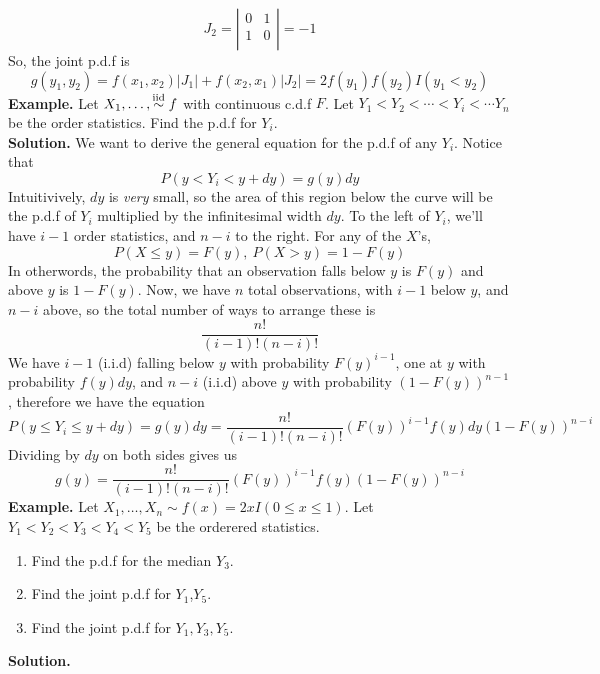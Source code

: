 \documentclass[openany]{report}
\begin{document}
     \[J_2 = \left|\begin{matrix}
        0 & 1 \\
        1 & 0\\
     \end{matrix}\right| = -1\]
     So, the joint p.d.f is 
     \[g(y_1,y_2) = f(x_1,x_2)|J_1| + f(x_2, x_1)|J_2| = 2f(y_1)f(y_2)I(y_1 < y_2)\]
     \textbf{Example.} Let $X_1, \ldots, \overset{\mathrm{iid}}{\sim} f$ with continuous c.d.f $F$. Let $Y_1 < Y_2 < \cdots < Y_i < \cdots Y_n$ be the order statistics. Find the p.d.f for  $Y_i$. \\[2ex]
     \textbf{Solution.} We want to derive the general equation for the p.d.f of any $Y_i$. Notice that 
     \[P(y < Y_i < y + dy) = g(y)dy\]
     Intuitivively, $dy$ is \emph{very} small, so the area of this region below the curve will be the p.d.f of $Y_i$ multiplied by the infinitesimal width $dy$. To the left of $Y_i$, we'll have $i - 1$ order statistics, and $n-i$ to the right. For any of the $X$'s, 
     \[P(X \leq y) = F(y), \ P(X > y) = 1 - F(y)\]
     In otherwords, the probability that an observation falls below $y$ is $F(y)$ and above $y$ is $1 - F(y)$. Now, we have $n$ total observations, with $i-1$ below $y$, and $n-i$ above, so the total number of ways to arrange these is 
     \[\frac{n!}{(i-1)!(n-i)!}\]
     We have $i-1$ (i.i.d) falling below $y$ with probability $F(y)^{i-1}$, one at $y$ with probability $f(y)dy$, and $n-i$ (i.i.d) above $y$ with probability $(1-F(y))^{n-1}$, therefore we have the equation 
     \[P(y \leq Y_i \leq y + dy) = g(y)dy = \frac{n!}{(i-1)!(n-i)!}(F(y))^{i-1}f(y)dy(1-F(y))^{n-i}\]
     Dividing by $dy$ on both sides gives us 
     \[g(y) = \frac{n!}{(i-1)!(n-i)!}(F(y))^{i-1}f(y)(1-F(y))^{n-i}\]
     \textbf{Example.} Let $X_1, \ldots, X_n \sim f(x) = 2xI(0 \leq x \leq 1)$. Let $Y_1 < Y_2 < Y_3 < Y_4 < Y_5$ be the orderered statistics. 
     \begin{enumerate}[label=(\roman*)]
        \item Find the p.d.f for the median $Y_3$. 
        \item Find the joint p.d.f for $Y_1$,$Y_5$.
        \item Find the joint p.d.f for $Y_1, Y_3, Y_5$. 
     \end{enumerate}
     \noindent
     \textbf{Solution.} 
\end{document}

